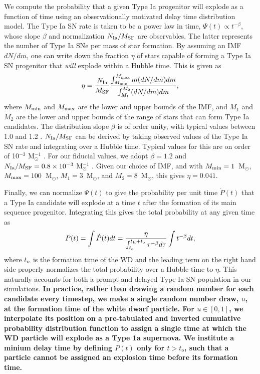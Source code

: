 \documentclass[fleqn,usenatbib,useAMS]{mnras}
\begin{document}
We compute the probability that a given Type Ia progenitor will explode as a function of time using an observationally motivated delay time distribution model. The Type Ia SN rate is taken to be a power law in time, $\Psi (t) \propto t^{-\beta}$, whose slope $\beta$ and normalization $N_{\rm Ia}/M_{\rm SF}$ are observables. The latter represents the number of Type Ia SNe per mass of star formation.  By assuming an IMF  $dN/dm$, one can write down the fraction $\eta$ of stars capable of forming a Type Ia SN progenitor that \textit{will} explode within a Hubble time. This is given as
\begin{equation}
\eta = \frac{N_{\rm Ia}}{M_{\rm SF}} \frac{\int_{M_{\rm min}}^{M_{\rm max}} m (dN/dm) dm }{\int_{M_{1}}^{M_{2}} (dN/dm) dm},
\end{equation}
where $M_{\rm min}$ and $M_{\rm max}$ are the lower and upper bounds of the IMF, and $M_{1}$ and $M_{2}$ are the lower and upper bounds of the range of stars that can form Type Ia candidates. The distribution slope $\beta$ is of order unity, with typical values between 1.0 and 1.2 \citep[see][for a recent review]{Maoz2014}. $N_{\rm Ia}/M_{\rm SF}$ can be derived by taking observed values of the Type Ia SN rate and integrating over a Hubble time. Typical values for this are on order of 10$^{-3}$ M$_{\odot}^{-1}$ \citep{Maoz2014}. For our fiducial values, we adopt $\beta = 1.2$ \citep{Maoz2010} and $N_{\rm Ia}/M_{\rm SF} = 0.8\times 10^{-3}$ M$_{\odot}^{-1}$ \citep{GraurMaoz2013}. Given our choice of IMF, and with $M_{\rm min} = 1$~M$_{\odot}$, $M_{\rm max}=100$~M$_{\odot}$, $M_{1}=3$~M$_{\odot}$, and $M_{2}=8$~M$_{\odot}$, this gives $\eta = 0.041$.

Finally, we can normalize $\Psi(t)$ to give the probability per unit time $\dot{P}(t)$ that a Type Ia candidate will explode at a time $t$ after the formation of its main sequence progenitor. Integrating this gives the total probability at any given time as
\begin{equation}
P(t) = \int \dot{P}(t)dt = \frac{\eta}{{ \int_{t_{\rm o}}^{t_{\rm H} + t_{\rm o}} \tau^{-\beta} d\tau}} \int t^{-\beta} dt,
\end{equation}
where $t_{\rm o}$ is the formation time of the WD and the leading term on the right hand side properly normalizes the total probability over a Hubble time to $\eta$. This naturally accounts for both a prompt and delayed Type Ia SN population in our simulations.
\textbf{In practice, rather than drawing a random number for each candidate every timestep, we make a single random number draw, $u$, at the formation time of the white dwarf particle. For $u \in [0,1]$, we interpolate its position on a pre-tabulated and inverted cumulative probability distribution function to assign a single time at which the WD particle will explode as a Type 1a supernova. We institute a minium delay time by defining $P(t)$ only for $t > t_o$, such that a particle cannot be assigned an explosion time before its formation time.}
\end{document}

